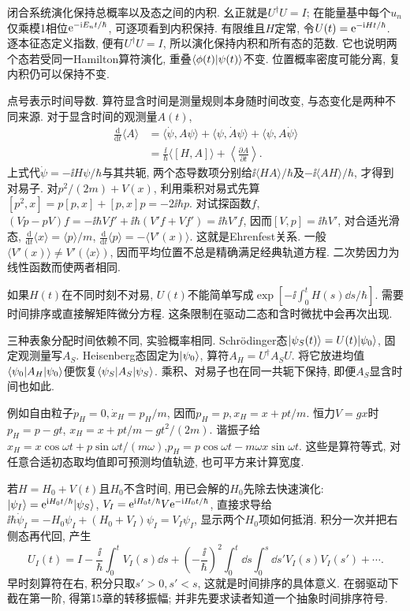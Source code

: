 闭合系统演化保持总概率以及态之间的内积. 幺正就是$U^\dagger U=I$; 在能量基中每个$u_n$仅乘模1相位$\mathrm e^{-\mathrm i E_nt/\hbar}$, 可逐项看到内积保持. 有限维且$H$定常, 令$U(t)=\mathrm e^{-\mathrm i Ht/\hbar}$. 逐本征态定义指数, 便有$U^\dagger U=I$, 所以演化保持内积和所有态的范数. 它也说明两个态若受同一Hamilton算符演化, 重叠$\langle \phi(t)\vert \psi(t)\rangle$不变. 位置概率密度可能分离, 复内积仍可以保持不变.

点号表示时间导数. 算符显含时间是测量规则本身随时间改变, 与态变化是两种不同来源. 对于显含时间的观测量$A(t)$,
\begin{align*}
\frac{\mathrm d}{\mathrm dt}\langle A\rangle
&=\langle\dot\psi,A\psi\rangle+\langle\psi,\dot A\psi\rangle+\langle\psi,A\dot\psi\rangle\\
&=\frac{\ii}{\hbar}\langle[H,A]\rangle+\left\langle\frac{\partial A}{\partial t}\right\rangle.
\end{align*}
上式代$\dot\psi=-\ii H\psi/\hbar$与其共轭, 两个态导数项分别给$\ii\langle HA\rangle/\hbar$及$-\ii\langle AH\rangle/\hbar$, 才得到对易子. 对$p^2/(2m)+V(x)$, 利用乘积对易式先算$[p^2,x]=p[p,x]+[p,x]p=-2\ii\hbar p$. 对试探函数$f$, $(Vp-pV)f=-\ii\hbar Vf\prime+\ii\hbar(V\prime f+Vf\prime)=\ii\hbar V\prime f$, 因而$[V,p]=\ii\hbar V\prime$, 对合适光滑态, $\frac{\mathrm d}{\mathrm dt}\langle x\rangle=\langle p\rangle/m$, $\frac{\mathrm d}{\mathrm dt}\langle p\rangle=-\langle V'(x)\rangle$. 这就是Ehrenfest关系. 一般$\langle V'(x)\rangle\ne V'(\langle x\rangle)$, 因而平均位置不总是精确满足经典轨道方程. 二次势因力为线性函数而使两者相同.

\begin{remark}
如果$H(t)$在不同时刻不对易, $U(t)$不能简单写成$\exp[-\ii\int_0^tH(s)\dd s/\hbar]$. 需要时间排序或直接解矩阵微分方程. 这条限制在驱动二态和含时微扰中会再次出现.
\end{remark}

三种表象分配时间依赖不同, 实验概率相同. Schrödinger态$\lvert \psi_S(t)\rangle=U(t)\lvert \psi_0\rangle$, 固定观测量写$A_S$. Heisenberg态固定为$\lvert \psi_0\rangle$, 算符$A_H=U^\dagger A_SU$. 将它放进均值$\langle \psi_0\rvert A_H\lvert \psi_0\rangle$便恢复$\langle \psi_S\rvert A_S\lvert \psi_S\rangle$. 乘积、对易子也在同一共轭下保持, 即便$A_S$显含时间也如此.

例如自由粒子$\dot p_H=0,\dot x_H=p_H/m$, 因而$p_H=p,x_H=x+pt/m$. 恒力$V=gx$时$p_H=p-gt$, $x_H=x+pt/m-gt^2/(2m)$. 谐振子给$x_H=x\cos\omega t+p\sin\omega t/(m\omega)$,$p_H=p\cos\omega t-m\omega x\sin\omega t$. 这些是算符等式, 对任意合适初态取均值即可预测均值轨迹, 也可平方来计算宽度.

若$H=H_0+V(t)$且$H_0$不含时间, 用已会解的$H_0$先除去快速演化: $\lvert \psi_I\rangle=\mathrm e^{\mathrm i H_0t/\hbar}\lvert \psi_S\rangle$, $V_I=\mathrm e^{\mathrm i H_0t/\hbar}V\mathrm e^{-\mathrm i H_0t/\hbar}$, 直接求导给$\ii\hbar\dot\psi_I=-H_0\psi_I+(H_0+V_I)\psi_I=V_I\psi_I$, 显示两个$H_0$项如何抵消. 积分一次并把右侧态再代回, 产生
\[
U_I(t)=I-\frac\ii\hbar\int_0^tV_I(s)\dd s+
\left(-\frac\ii\hbar\right)^2\int_0^t\dd s\int_0^s\dd s' V_I(s)V_I(s')+\cdots.
\]
早时刻算符在右, 积分只取$s'>0,s'<s$, 这就是时间排序的具体意义. 在弱驱动下截在第一阶, 得第15章的转移振幅; 并非先要求读者知道一个抽象时间排序符号.
